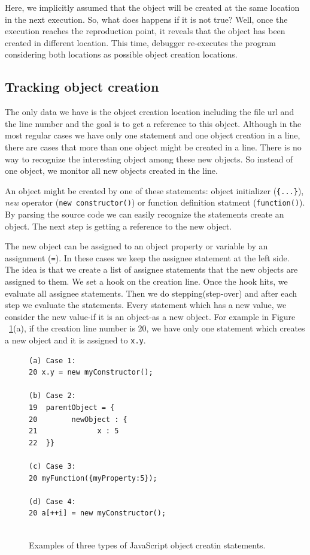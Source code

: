 \documentclass[preprint]{sigplanconf}
\begin{document}
Here, we implicitly assumed that the object will be created at 
the same location in the next execution. So, what does happens if it
is not true? Well, once the execution reaches the reproduction point, it
reveals that the object has been created in different location. This time,
debugger re-executes the program considering both locations as possible 
object creation locations.
 
\subsection{Tracking object creation}
The only data we have is the object creation location including the
file url and the line number and the goal is to get a reference to
this object. Although in the most regular cases we have only one
statement and one object creation in a line, there are cases that more
than one object might be created in a line. There is no way to
recognize the interesting object among these new objects. So instead
of one object, we monitor all new objects created in the line.

An object might be created by one of these statements: object
initializer (\texttt{\{...\}}), \textit{new} operator (\texttt{new 
constructor()}) or function definition statment (\texttt{function()}). 
By parsing the source code we can easily recognize the statements 
create an object. The next step is getting a reference to the new object.

The new object can be assigned to an object property or variable by
an assignment (\texttt{=}). In these cases we keep the assignee statement 
at the left side. The idea is that we create a list of assignee statements 
that the new objects are assigned to them. We set a hook on the creation
line. Once the hook hits, we evaluate all assignee statements. Then 
we do stepping(step-over) and after each step we evaluate the
statements. Every statement which has a new value, we consider the new
value-if it is an object-as a new object. For example in Figure
~\ref{fig:objectCreation}(a), if the creation line number is 20, we
have only one statement which creates a new object and it is assigned
to \texttt{x.y}.


\begin{figure}[htp]
\begin{verbatim}
(a) Case 1:
20 x.y = new myConstructor();

(b) Case 2:
19  parentObject = {
20   	  newObject : {
21  			x : 5
22  }}

(c) Case 3:
20 myFunction({myProperty:5});

(d) Case 4:
20 a[++i] = new myConstructor();
 
\end{verbatim}
\caption{Examples of three types of JavaScript object creatin statements.}
\label{fig:objectCreation}
\end{figure}
\end{document}
